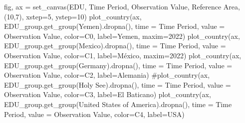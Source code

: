 \documentclass[
  letterpaper,
  DIV=11,
  numbers=noendperiod]{scrreprt}
\newenvironment{Shaded}{\begin{snugshade}}{\end{snugshade}}
\newcommand{\CommentTok}[1]{\textcolor[rgb]{0.37,0.37,0.37}{#1}}
\newcommand{\DecValTok}[1]{\textcolor[rgb]{0.68,0.00,0.00}{#1}}
\newcommand{\NormalTok}[1]{\textcolor[rgb]{0.00,0.23,0.31}{#1}}
\newcommand{\OperatorTok}[1]{\textcolor[rgb]{0.37,0.37,0.37}{#1}}
\newcommand{\StringTok}[1]{\textcolor[rgb]{0.13,0.47,0.30}{#1}}
\begin{document}
\begin{Shaded}
\begin{Highlighting}[]
\NormalTok{fig, ax }\OperatorTok{=}\NormalTok{ set\_canvas(EDU, }\StringTok{\textquotesingle{}Time Period\textquotesingle{}}\NormalTok{, }\StringTok{\textquotesingle{}Observation Value\textquotesingle{}}\NormalTok{, }\StringTok{\textquotesingle{}Reference Area\textquotesingle{}}\NormalTok{, (}\DecValTok{10}\NormalTok{,}\DecValTok{7}\NormalTok{), xstep}\OperatorTok{=}\DecValTok{5}\NormalTok{, ystep}\OperatorTok{=}\DecValTok{10}\NormalTok{)}
\NormalTok{plot\_country(ax, EDU\_group.get\_group(}\StringTok{\textquotesingle{}Yemen\textquotesingle{}}\NormalTok{).dropna(), time }\OperatorTok{=} \StringTok{\textquotesingle{}Time Period\textquotesingle{}}\NormalTok{, value }\OperatorTok{=} \StringTok{\textquotesingle{}Observation Value\textquotesingle{}}\NormalTok{, color}\OperatorTok{=}\StringTok{\textquotesingle{}C0\textquotesingle{}}\NormalTok{, label}\OperatorTok{=}\StringTok{\textquotesingle{}Yemen\textquotesingle{}}\NormalTok{, maxim}\OperatorTok{=}\DecValTok{2022}\NormalTok{)}
\NormalTok{plot\_country(ax, EDU\_group.get\_group(}\StringTok{\textquotesingle{}Mexico\textquotesingle{}}\NormalTok{).dropna(), time }\OperatorTok{=} \StringTok{\textquotesingle{}Time Period\textquotesingle{}}\NormalTok{, value }\OperatorTok{=} \StringTok{\textquotesingle{}Observation Value\textquotesingle{}}\NormalTok{, color}\OperatorTok{=}\StringTok{\textquotesingle{}C1\textquotesingle{}}\NormalTok{, label}\OperatorTok{=}\StringTok{\textquotesingle{}México\textquotesingle{}}\NormalTok{, maxim}\OperatorTok{=}\DecValTok{2022}\NormalTok{)}
\NormalTok{plot\_country(ax, EDU\_group.get\_group(}\StringTok{\textquotesingle{}Germany\textquotesingle{}}\NormalTok{).dropna(), time }\OperatorTok{=} \StringTok{\textquotesingle{}Time Period\textquotesingle{}}\NormalTok{, value }\OperatorTok{=} \StringTok{\textquotesingle{}Observation Value\textquotesingle{}}\NormalTok{, color}\OperatorTok{=}\StringTok{\textquotesingle{}C2\textquotesingle{}}\NormalTok{, label}\OperatorTok{=}\StringTok{\textquotesingle{}Alemania\textquotesingle{}}\NormalTok{)}
\CommentTok{\#plot\_country(ax, EDU\_group.get\_group(\textquotesingle{}Holy See\textquotesingle{}).dropna(), time = \textquotesingle{}Time Period\textquotesingle{}, value = \textquotesingle{}Observation Value\textquotesingle{}, color=\textquotesingle{}C3\textquotesingle{}, label=\textquotesingle{}El Baticano\textquotesingle{})}
\NormalTok{plot\_country(ax, EDU\_group.get\_group(}\StringTok{\textquotesingle{}United States of America\textquotesingle{}}\NormalTok{).dropna(), time }\OperatorTok{=} \StringTok{\textquotesingle{}Time Period\textquotesingle{}}\NormalTok{, value }\OperatorTok{=} \StringTok{\textquotesingle{}Observation Value\textquotesingle{}}\NormalTok{, color}\OperatorTok{=}\StringTok{\textquotesingle{}C4\textquotesingle{}}\NormalTok{, label}\OperatorTok{=}\StringTok{\textquotesingle{}USA\textquotesingle{}}\NormalTok{)}

\end{Highlighting}
\end{Shaded}
\end{document}
